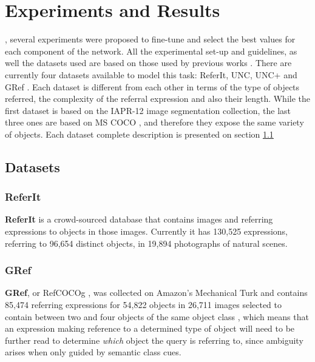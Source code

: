 
\chapter{Experiments and Results}

, several experiments were proposed to fine-tune and select the best values for each component of the network. All the experimental set-up and guidelines, as well the datasets used are based on those used by previous works \cite{hu2016segmentation, liu2017segmentation}.   There are currently four datasets available to model this task: ReferIt, UNC, UNC+ \cite{KazemzadehOrdonezMattenBergEMNLP14} and GRef \cite{DBLP:journals/corr/MaoHTCYM15}. Each dataset is different from each other in terms of the type of objects referred, the complexity of the referral expression and also their length. While the first dataset is based on the IAPR-12 \cite{ESCALANTE2010419} image segmentation collection, the last three ones are based on MS COCO \cite{DBLP:journals/corr/LinMBHPRDZ14}, and therefore they expose the same variety of objects. Each dataset complete description is presented on section \ref{section:datasets}

\section{Datasets}
\label{section:datasets}
\subsection{ReferIt}
\textbf{ReferIt} \cite{KazemzadehOrdonezMattenBergEMNLP14} is a crowd-sourced database that contains images and referring expressions to objects in those images. Currently it has 130,525 expressions, referring to 96,654 distinct objects, in 19,894 photographs of natural scenes.

\subsection{GRef}
\textbf{GRef}, or RefCOCOg \cite{DBLP:journals/corr/MaoHTCYM15}, was collected on Amazon's Mechanical Turk and contains 85,474 referring expressions for 54,822 objects in 26,711 images selected to contain between two and four objects of the same object class \cite{DBLP:journals/corr/YuPYBB16}, which means that an expression making reference to a determined type of object will need to be further read to determine \textit{which} object the query is referring to, since ambiguity arises when only guided by semantic class cues.


